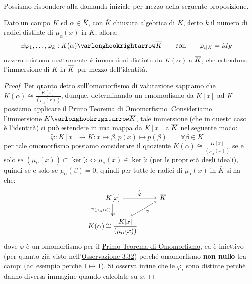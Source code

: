 \documentclass[11pt]{scrartcl}
\begin{document}
Possiamo rispondere alla domanda iniziale per mezzo della seguente proposizione.

\begin{proposition}
    \label{3.33}
    Dato un campo $K$ ed $\alpha \in \overline K$, con $\overline K$ chiusura algebrica di $K$, detto $k$ il numero di radici distinte di $\mu_\alpha(x)$ in $\overline K$, allora:
    \[ \exists \varphi_1,\ldots,\varphi_k : K(\alpha) \varlonghookrightarrow \overline K \qquad \text{con} \qquad \varphi_{i|K} = id_K
        \]
    ovvero esistono esattamente $k$ immersioni distinte da $K(\alpha)$ a $\overline K$, che estendono l'immersione di $K$ in $\overline K$ per mezzo dell'identità.
\end{proposition}

\begin{proof}
    Per quanto detto sull'omomorfismo di valutazione sappiamo che $\displaystyle K(\alpha) \cong \frac{K[x]}{(\mu_\alpha(x))}$, dunque, determinando un omomorfismo da $K[x]$ ad $\overline K$ possiamo applicare il 
    \hyperref[omo]{Primo Teorema di Omomorfismo}. Consideriamo l'immersione $K \varlonghookrightarrow \ol K$, tale immersione (che in questo caso è l'identità) si può estendere in una mappa da $K[x]$ a $\overline K$ nel seguente modo:
    \[ \widetilde{\varphi} : K[x] \longrightarrow \overline K : x \longmapsto \beta , p(x) \longmapsto p(\beta) \qquad \forall \beta \in \overline K
        \]
    per tale omomorfismo possiamo considerare il quoziente $\displaystyle K(\alpha) \cong \frac{K[x]}{(\mu_\alpha(x))}$ se e solo se $(\mu_\alpha(x)) \subset \ker \widetilde{\varphi} \iff \mu_\alpha(x) \in \ker \widetilde{\varphi}$ (per le proprietà degli ideali), quindi se e solo se $\mu_\alpha(\beta) = 0$,
    quindi per tutte le radici di $\mu_\alpha(x)$ in $\overline K$ si ha che:
    \[\begin{tikzcd}
		K[x] \arrow[d, "\pi_{(\mu_\alpha(x))}" left, twoheadrightarrow] \arrow[r, "\widetilde{\varphi}"] & \overline K \\	
		\displaystyle K(\alpha) \cong \frac{K[x]}{(\mu_\alpha(x))} \arrow[ur, "\varphi"', hookrightarrow] & 
	\end{tikzcd}
        \]
    dove $\varphi$ è un omomorfismo per il \hyperref[omo]{Primo Teorema di Omomorfismo}, ed è iniettivo (per quanto già visto nell'\hyperref[3.32]{Osservazione 3.32}) perché omomorfismo \textbf{non nullo} tra campi (ad esempio perché $1 \longmapsto 1$). Si osserva infine che 
    le $\varphi_i$ sono distinte perché danno diversa immagine quando calcolate su $x$.
\end{proof}
\end{document}
